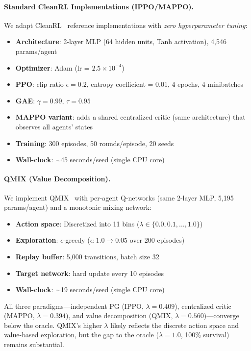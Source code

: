 \documentclass{article}
\begin{document}
\paragraph{Standard CleanRL Implementations (IPPO/MAPPO).}
We adapt CleanRL~\citep{huang2022cleanrl} reference implementations with \emph{zero hyperparameter tuning}:
\begin{itemize}\setlength{\itemsep}{0pt}
    \item \textbf{Architecture}: 2-layer MLP (64 hidden units, Tanh activation), 4,546 params/agent
    \item \textbf{Optimizer}: Adam (lr = $2.5 \times 10^{-4}$)
    \item \textbf{PPO}: clip ratio $\epsilon = 0.2$, entropy coefficient = 0.01, 4 epochs, 4 minibatches
    \item \textbf{GAE}: $\gamma = 0.99$, $\tau = 0.95$
    \item \textbf{MAPPO variant}: adds a shared centralized critic (same architecture) that observes all agents' states
    \item \textbf{Training}: 300 episodes, 50 rounds/episode, 20 seeds
    \item \textbf{Wall-clock}: $\sim$45 seconds/seed (single CPU core)
\end{itemize}

\paragraph{QMIX (Value Decomposition).}
We implement QMIX~\citep{rashid2018qmix} with per-agent Q-networks (same 2-layer MLP, 5,195 params/agent) and a monotonic mixing network:
\begin{itemize}\setlength{\itemsep}{0pt}
    \item \textbf{Action space}: Discretized into 11 bins ($\lambda \in \{0.0, 0.1, \ldots, 1.0\}$)
    \item \textbf{Exploration}: $\epsilon$-greedy ($\epsilon: 1.0 \to 0.05$ over 200 episodes)
    \item \textbf{Replay buffer}: 5,000 transitions, batch size 32
    \item \textbf{Target network}: hard update every 10 episodes
    \item \textbf{Wall-clock}: $\sim$19 seconds/seed (single CPU core)
\end{itemize}

\noindent All three paradigms---independent PG (IPPO, $\lambda{=}0.409$), centralized critic (MAPPO, $\lambda{=}0.394$), and value decomposition (QMIX, $\lambda{=}0.560$)---converge below the oracle.
QMIX's higher $\lambda$ likely reflects the discrete action space and value-based exploration, but the gap to the oracle ($\lambda{=}1.0$, 100\% survival) remains substantial.
\end{document}

